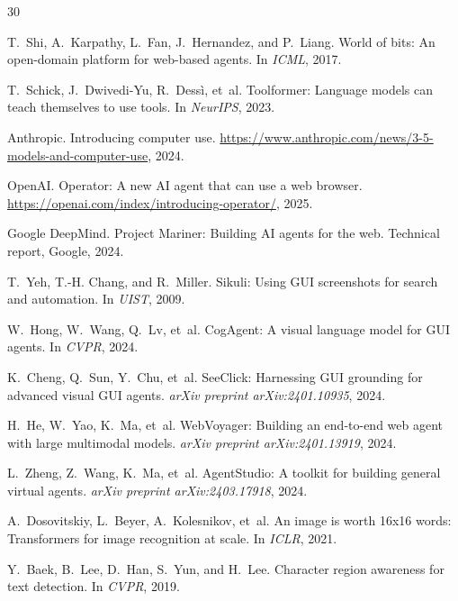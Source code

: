 
\begin{thebibliography}{30}

T.~Shi, A.~Karpathy, L.~Fan, J.~Hernandez, and P.~Liang.
\newblock World of bits: An open-domain platform for web-based agents.
\newblock In \emph{ICML}, 2017.

T.~Schick, J.~Dwivedi-Yu, R.~Dess{\`i}, et~al.
\newblock Toolformer: Language models can teach themselves to use tools.
\newblock In \emph{NeurIPS}, 2023.

Anthropic.
\newblock Introducing computer use.
\newblock \url{https://www.anthropic.com/news/3-5-models-and-computer-use}, 2024.

OpenAI.
\newblock Operator: A new AI agent that can use a web browser.
\newblock \url{https://openai.com/index/introducing-operator/}, 2025.

Google DeepMind.
\newblock Project Mariner: Building AI agents for the web.
\newblock Technical report, Google, 2024.

T.~Yeh, T.-H. Chang, and R.~Miller.
\newblock Sikuli: Using GUI screenshots for search and automation.
\newblock In \emph{UIST}, 2009.

W.~Hong, W.~Wang, Q.~Lv, et~al.
\newblock CogAgent: A visual language model for GUI agents.
\newblock In \emph{CVPR}, 2024.

K.~Cheng, Q.~Sun, Y.~Chu, et~al.
\newblock SeeClick: Harnessing GUI grounding for advanced visual GUI agents.
\newblock \emph{arXiv preprint arXiv:2401.10935}, 2024.

H.~He, W.~Yao, K.~Ma, et~al.
\newblock WebVoyager: Building an end-to-end web agent with large multimodal models.
\newblock \emph{arXiv preprint arXiv:2401.13919}, 2024.

L.~Zheng, Z.~Wang, K.~Ma, et~al.
\newblock AgentStudio: A toolkit for building general virtual agents.
\newblock \emph{arXiv preprint arXiv:2403.17918}, 2024.

A.~Dosovitskiy, L.~Beyer, A.~Kolesnikov, et~al.
\newblock An image is worth 16x16 words: Transformers for image recognition at scale.
\newblock In \emph{ICLR}, 2021.

Y.~Baek, B.~Lee, D.~Han, S.~Yun, and H.~Lee.
\newblock Character region awareness for text detection.
\newblock In \emph{CVPR}, 2019.


\end{thebibliography}
